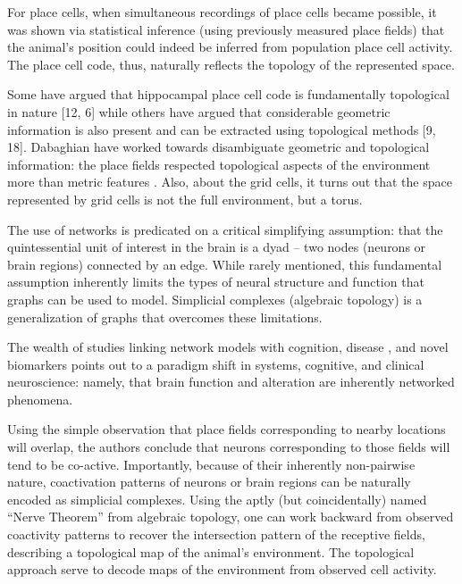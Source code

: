 \documentclass[onecollarge,runningheads]{svjour2}
\begin{document}
For place cells, when simultaneous recordings of place cells became possible, it was shown via statistical inference (using previously measured place fields) that the animal's position could indeed be inferred from population place cell activity. The place cell code, thus, naturally reflects the topology of the represented space.

\citep{curto2016can} Some have argued that hippocampal place cell code is fundamentally topological in nature [12, 6] while others have argued that considerable geometric information is also present and can be extracted using topological methods [9, 18]. Dabaghian have worked towards disambiguate geometric and topological information: the place fields respected topological aspects of the environment more than metric features \citep{dabaghian2014reconceiving}. Also, about the grid cells, it turns out that the space represented by grid cells is not the full environment, but a torus.

\citep{giusti2016two} The use of networks is predicated on a critical simplifying assumption: that the quintessential unit of interest in the brain is a dyad – two nodes (neurons or brain regions) connected by an edge. While rarely mentioned, this fundamental assumption inherently
limits the types of neural structure and function that graphs can be used to model. Simplicial complexes (algebraic topology) is a generalization of graphs that overcomes these limitations.

The wealth of studies linking network models with cognition, disease \citep{stefan2013epileptic}, \citep{stam2014modern} and novel biomarkers points out to a paradigm shift in systems, cognitive, and clinical neuroscience: namely, that brain function and alteration are inherently networked phenomena.


Using the simple observation that place fields corresponding to nearby locations will overlap, the authors conclude that neurons corresponding to those fields will tend to be co-active. Importantly, because of their inherently non-pairwise nature, coactivation patterns of neurons or brain regions can be naturally encoded as simplicial complexes. 
Using the aptly (but coincidentally) named “Nerve Theorem” from algebraic topology, one can work backward from observed coactivity patterns to recover the intersection pattern of the receptive fields, describing a topological map of the animal’s environment.
The topological approach serve to decode maps of the environment from observed cell activity.
\end{document}
